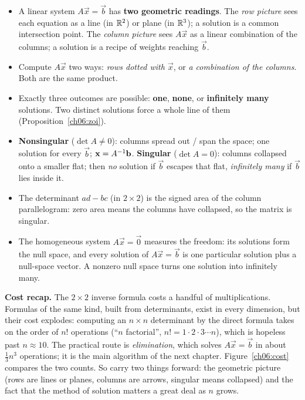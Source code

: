 \begin{itemize}
  \item A linear system $A\vec x=\vec b$ has \textbf{two geometric readings}.
  The \emph{row picture} sees each equation as a line (in $\mathbb{R}^2$) or plane
  (in $\mathbb{R}^3$); a solution is a common intersection point. The \emph{column
  picture} sees $A\vec x$ as a linear combination of the columns; a solution
  is a recipe of weights reaching $\vec b$.
  \item Compute $A\vec x$ two ways: \emph{rows dotted with $\vec x$}, or
  \emph{a combination of the columns}. Both are the same product.
  \item Exactly three outcomes are possible: \textbf{one}, \textbf{none}, or
  \textbf{infinitely many} solutions. Two distinct solutions force a whole
  line of them (Proposition~\ref{ch06:zoi}).
  \item \textbf{Nonsingular} ($\det A\neq0$): columns spread out / span the
  space; one solution for every $\vec b$; $\mathbf{x}=A^{-1}\mathbf{b}$.
  \textbf{Singular} ($\det A=0$): columns collapsed onto a smaller flat;
  then \emph{no} solution if $\vec b$ escapes that flat, \emph{infinitely
  many} if $\vec b$ lies inside it.
  \item The determinant $ad-bc$ (in $2\times2$) is the signed area of the
  column parallelogram: zero area means the columns have collapsed, so the
  matrix is singular.
  \item The homogeneous system $A\vec x=\vec0$ measures the freedom: its
  solutions form the null space, and every solution of $A\vec x=\vec b$ is one
  particular solution plus a null-space vector. A nonzero null space turns
  one solution into infinitely many.
\end{itemize}

\begin{marginnotebox}
\textbf{Cost recap.} The $2\times2$ inverse formula costs a handful of
multiplications. Formulas of the same kind, built from determinants, exist
in every dimension, but their cost explodes: computing an $n\times n$
determinant by the direct formula takes on the order of $n!$ operations
(``$n$ factorial'', $n! = 1\cdot2\cdot3\cdots n$), which is hopeless past
$n\approx 10$. The practical route is \emph{elimination}, which solves
$A\vec x=\vec b$ in about $\tfrac13 n^3$ operations; it is the main
algorithm of the next chapter. Figure~\ref{ch06:cost} compares the two
counts. So carry two things forward: the geometric picture (rows are
lines or planes, columns are arrows, singular means collapsed) and the fact
that the method of solution matters a great deal as $n$ grows.
\end{marginnotebox}

